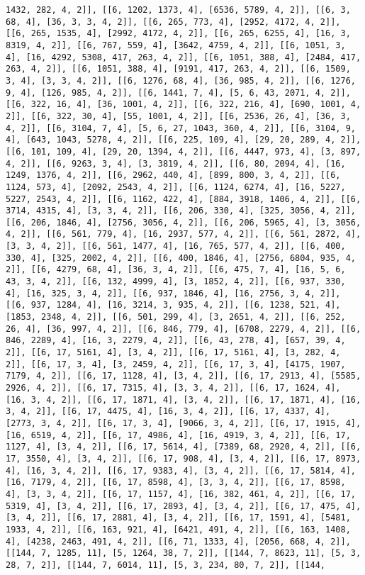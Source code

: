 \documentclass[12pt,fleqn]{article}\usepackage{../../common}
\begin{document}
\begin{verbatim}
1432, 282, 4, 2]], [[6, 1202, 1373, 4], [6536, 5789, 4, 2]], [[6, 3, 68, 4], [36, 3, 3, 4, 2]], [[6, 265, 773, 4], [2952, 4172, 4, 2]], [[6, 265, 1535, 4], [2992, 4172, 4, 2]], [[6, 265, 6255, 4], [16, 3, 8319, 4, 2]], [[6, 767, 559, 4], [3642, 4759, 4, 2]], [[6, 1051, 3, 4], [16, 4292, 5308, 417, 263, 4, 2]], [[6, 1051, 388, 4], [2484, 417, 263, 4, 2]], [[6, 1051, 388, 4], [9191, 417, 263, 4, 2]], [[6, 1509, 3, 4], [3, 3, 4, 2]], [[6, 1276, 68, 4], [36, 985, 4, 2]], [[6, 1276, 9, 4], [126, 985, 4, 2]], [[6, 1441, 7, 4], [5, 6, 43, 2071, 4, 2]], [[6, 322, 16, 4], [36, 1001, 4, 2]], [[6, 322, 216, 4], [690, 1001, 4, 2]], [[6, 322, 30, 4], [55, 1001, 4, 2]], [[6, 2536, 26, 4], [36, 3, 4, 2]], [[6, 3104, 7, 4], [5, 6, 27, 1043, 360, 4, 2]], [[6, 3104, 9, 4], [643, 1043, 5278, 4, 2]], [[6, 225, 109, 4], [29, 20, 289, 4, 2]], [[6, 101, 109, 4], [29, 20, 1394, 4, 2]], [[6, 4447, 973, 4], [3, 897, 4, 2]], [[6, 9263, 3, 4], [3, 3819, 4, 2]], [[6, 80, 2094, 4], [16, 1249, 1376, 4, 2]], [[6, 2962, 440, 4], [899, 800, 3, 4, 2]], [[6, 1124, 573, 4], [2092, 2543, 4, 2]], [[6, 1124, 6274, 4], [16, 5227, 5227, 2543, 4, 2]], [[6, 1162, 422, 4], [884, 3918, 1406, 4, 2]], [[6, 3714, 4315, 4], [3, 3, 4, 2]], [[6, 206, 330, 4], [325, 3056, 4, 2]], [[6, 206, 1846, 4], [2756, 3056, 4, 2]], [[6, 206, 5965, 4], [3, 3056, 4, 2]], [[6, 561, 779, 4], [16, 2937, 577, 4, 2]], [[6, 561, 2872, 4], [3, 3, 4, 2]], [[6, 561, 1477, 4], [16, 765, 577, 4, 2]], [[6, 400, 330, 4], [325, 2002, 4, 2]], [[6, 400, 1846, 4], [2756, 6804, 935, 4, 2]], [[6, 4279, 68, 4], [36, 3, 4, 2]], [[6, 475, 7, 4], [16, 5, 6, 43, 3, 4, 2]], [[6, 132, 4999, 4], [3, 1852, 4, 2]], [[6, 937, 330, 4], [16, 325, 3, 4, 2]], [[6, 937, 1846, 4], [16, 2756, 3, 4, 2]], [[6, 937, 1284, 4], [16, 3214, 3, 935, 4, 2]], [[6, 1238, 521, 4], [1853, 2348, 4, 2]], [[6, 501, 299, 4], [3, 2651, 4, 2]], [[6, 252, 26, 4], [36, 997, 4, 2]], [[6, 846, 779, 4], [6708, 2279, 4, 2]], [[6, 846, 2289, 4], [16, 3, 2279, 4, 2]], [[6, 43, 278, 4], [657, 39, 4, 2]], [[6, 17, 5161, 4], [3, 4, 2]], [[6, 17, 5161, 4], [3, 282, 4, 2]], [[6, 17, 3, 4], [3, 2459, 4, 2]], [[6, 17, 3, 4], [4175, 1907, 7179, 4, 2]], [[6, 17, 1128, 4], [3, 4, 2]], [[6, 17, 2913, 4], [5585, 2926, 4, 2]], [[6, 17, 7315, 4], [3, 3, 4, 2]], [[6, 17, 1624, 4], [16, 3, 4, 2]], [[6, 17, 1871, 4], [3, 4, 2]], [[6, 17, 1871, 4], [16, 3, 4, 2]], [[6, 17, 4475, 4], [16, 3, 4, 2]], [[6, 17, 4337, 4], [2773, 3, 4, 2]], [[6, 17, 3, 4], [9066, 3, 4, 2]], [[6, 17, 1915, 4], [16, 6519, 4, 2]], [[6, 17, 4986, 4], [16, 4919, 3, 4, 2]], [[6, 17, 1127, 4], [3, 4, 2]], [[6, 17, 5614, 4], [7389, 68, 2920, 4, 2]], [[6, 17, 3550, 4], [3, 4, 2]], [[6, 17, 908, 4], [3, 4, 2]], [[6, 17, 8973, 4], [16, 3, 4, 2]], [[6, 17, 9383, 4], [3, 4, 2]], [[6, 17, 5814, 4], [16, 7179, 4, 2]], [[6, 17, 8598, 4], [3, 3, 4, 2]], [[6, 17, 8598, 4], [3, 3, 4, 2]], [[6, 17, 1157, 4], [16, 382, 461, 4, 2]], [[6, 17, 5319, 4], [3, 4, 2]], [[6, 17, 2893, 4], [3, 4, 2]], [[6, 17, 475, 4], [3, 4, 2]], [[6, 17, 2881, 4], [3, 4, 2]], [[6, 17, 1591, 4], [5481, 1933, 4, 2]], [[6, 163, 921, 4], [6421, 491, 4, 2]], [[6, 163, 1408, 4], [4238, 2463, 491, 4, 2]], [[6, 71, 1333, 4], [2056, 668, 4, 2]], [[144, 7, 1285, 11], [5, 1264, 38, 7, 2]], [[144, 7, 8623, 11], [5, 3, 28, 7, 2]], [[144, 7, 6014, 11], [5, 3, 234, 80, 7, 2]], [[144, 
\end{verbatim}
\end{document}
